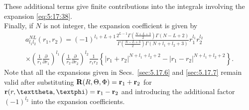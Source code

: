 These additional terms give finite contributions into the integrals involving the expansion \eqref{eq:5:17:38}.\\
Finally, if $N$ is not integer, the expansion coefficient is given by
\begin{multline}
a_{l_{1} l_{2}}^{N L}\left(r_{1}, r_{2}\right)=(-1)^{l_{1}+L+1} \frac{2^{L-1} \Gamma\left(\frac{N+L+3}{2}\right) \Gamma(N-L+2)}{\Gamma\left(\frac{N-L+3}{2}\right) \Gamma\left(N+l_{1}+l_{2}+3\right)} r_{1}^{l_{1}} r_{2}^{l_{2}}  \\
\times\left(\frac{1}{r_{1}} \frac{\partial}{\partial r_{1}}\right)^{l_{1}}\left(\frac{1}{r_{2}} \frac{\partial}{\partial r_{2}}\right)^{l_{2}} \frac{1}{r_{1} r_{2}}\left\{\left|r_{1}+r_{2}\right|^{N+l_{1}+l_{2}+2}-\left|r_{1}-r_{2}\right|^{N+l_{1}+l_{2}+2}\right\}. \label{eq:5:17:44}
\end{multline}
Note that all the expansions given in Secs.~\ref{sec:5.17.6} and \ref{sec:5.17.7} remain valid after substituting $\mathbf{R}(R, \Theta, \Phi)=\mathbf{r}_{1}+\mathbf{r}_{2}$ for $\vect{r}(r, \vartheta, \varphi)=\vect{r}_{1}-\vect{r}_{2}$ and introducing the additional factor $(-1)^{l_{2}}$ into the expansion coefficients.
